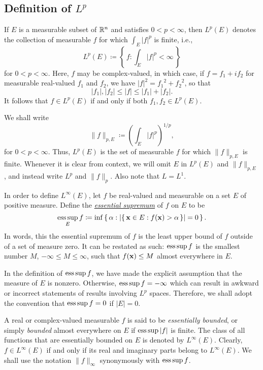 \subsection{Definition of $L^p$}
If $E$ is a measurable subset of $\mathbb{R}^n$ and satisfies $0<p<\infty$, then
\href{https://en.wikipedia.org/wiki/Lp_space}{$L^p(E)$} denotes the
collection of measurable $f$ for which $\int_E|f|^p$ is finite, i.e.,
\begin{equation}
  \label{eq:3:lp-space}
L^p(E)\coloneqq\left\{\,f:\int_E |f|^p<\infty\,\right\}
\end{equation}
for $0<p<\infty$. Here, $f$ may be complex-valued, in which case, if
$f=f_1+if_2$ for measurable real-valued $f_1$ and $f_2$, we have
$|f|^2={f_1}^2+{f_2}^2$, so that
\[
|f_1|,|f_2|\leq|f|\leq |f_1|+|f_2|.
\]
It follows that $f\in L^p(E)$ if and only if both $f_1,f_2\in L^p(E)$.

We shall write
\[
\|f\|_{p,E}\coloneqq\left(\int_E|f|^p\right)^{1/p},
\]
for $0<p<\infty$. Thus, $L^p(E)$ is the set of measurable $f$ for which
$\|f\|_{p,E}$ is finite. Whenever it is clear from context, we will omit
$E$ in $L^p(E)$ and $\|f\|_{p,E}$, and instead write $L^p$ and
$\|f\|_p$. Also note that $L=L^1$.

In order to define $L^\infty(E)$, let $f$ be real-valued and measurable on
a set $E$ of positive measure. Define the
\href{https://en.wikipedia.org/wiki/Essential_supremum_and_essential_infimum}{\emph{essential
  supremum}} of $f$ on $E$ to be
\begin{equation}
  \label{eq:3:essential-supremum}
\operatorname*{ess\,sup}_E f\coloneqq\inf\left\{\,\alpha:\left|\left\{\,\mathbf{x}\in
      E:f(\mathbf{x})>\alpha\,\right\}\right|=0\,\right\}.
\end{equation}
In words, this the essential supremum of $f$ is the least upper bound of
$f$ outside of a set of measure zero. It can be restated as such: $\operatorname*{ess\,sup}
f$ is the smallest number $M$, $-\infty\leq M\leq\infty$, such that
$f(\mathbf{x})\leq M$ almost everywhere in $E$.

In the definition of $\operatorname*{ess\,sup} f$, we have made the explicit assumption that
the measure of $E$ is nonzero. Otherwise, $\operatorname*{ess\,sup} f=-\infty$ which can
result in awkward or incorrect statements of results involving $L^p$
spaces. Therefore, we shall adopt the convention that $\operatorname*{ess\,sup} f=0$ if
$|E|=0$.

A real or complex-valued measurable $f$ is said to be \emph{essentially
  bounded}, or simply \emph{bounded} almost everywhere on $E$ if $\operatorname*{ess\,sup}
|f|$ is finite. The class of all functions that are essentially bounded on
$E$ is denoted by $L^\infty(E)$. Clearly, $f\in L^\infty(E)$ if and only if
its real and imaginary parts belong to $L^\infty(E)$. We shall use the
notation $\|f\|_\infty$ synonymously with $\operatorname*{ess\,sup} f$.

